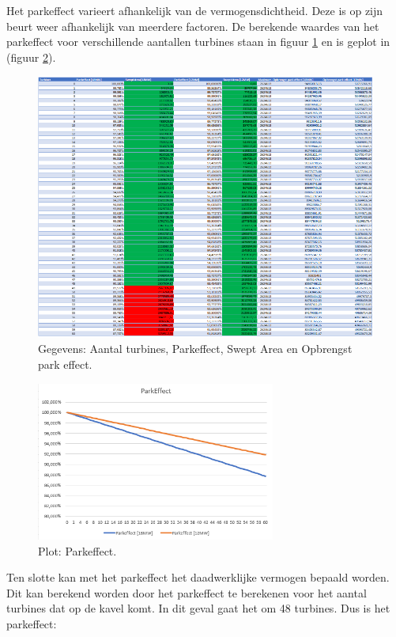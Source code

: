 Het parkeffect varieert afhankelijk van de vermogensdichtheid. Deze is op zijn beurt weer afhankelijk van meerdere factoren. De berekende waardes van het parkeffect voor verschillende aantallen turbines staan in figuur \ref{fig:Parkeffect_table} en is geplot in (figuur \ref{fig:ParkEffectGraph}). 

\begin{figure}[H]
\centering
\includegraphics[width=1\textwidth]{IMG/data/overzicht/Parkeffect.PNG}
\caption{Gegevens: Aantal turbines, Parkeffect, Swept Area en Opbrengst park effect.}
\label{fig:Parkeffect_table}
\end{figure}

\begin{figure}[H]
\centering
\includegraphics[width=0.7\textwidth]{IMG/data/overzicht/parkeffect_graph.PNG}
\caption{Plot: Parkeffect.}
\label{fig:ParkEffectGraph}
\end{figure}

Ten slotte kan met het parkeffect het daadwerklijke vermogen bepaald worden. Dit kan berekend worden door het parkeffect te berekenen voor het aantal turbines dat op de kavel komt. In dit geval gaat het om 48 turbines. Dus is het parkeffect: 

